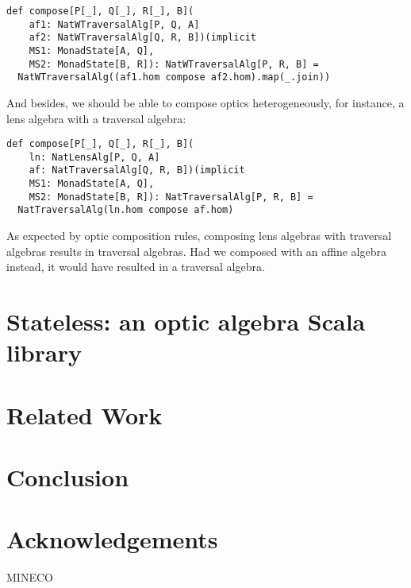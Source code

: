\documentclass[final, twocolumn, 3p]{elsarticle}
\begin{document}
\begin{lstlisting}
def compose[P[_], Q[_], R[_], B](
    af1: NatWTraversalAlg[P, Q, A]
    af2: NatWTraversalAlg[Q, R, B])(implicit
    MS1: MonadState[A, Q],
    MS2: MonadState[B, R]): NatWTraversalAlg[P, R, B] =
  NatWTraversalAlg((af1.hom compose af2.hom).map(_.join))
\end{lstlisting}

And besides, we should be able to compose optics heterogeneously, for instance,
a lens algebra with a traversal algebra:

\begin{lstlisting}
def compose[P[_], Q[_], R[_], B](
    ln: NatLensAlg[P, Q, A]
    af: NatTraversalAlg[Q, R, B])(implicit
    MS1: MonadState[A, Q],
    MS2: MonadState[B, R]): NatTraversalAlg[P, R, B] =
  NatTraversalAlg(ln.hom compose af.hom)
\end{lstlisting}

As expected by optic composition rules, composing lens algebras with traversal
algebras results in traversal algebras. Had we composed with an affine algebra
instead, it would have resulted in a traversal algebra.

\section{Stateless: an optic algebra Scala library}
\label{sec:Stateless}



\section{Related Work}
\label{sec:Discussion}

\section{Conclusion}



\section*{Acknowledgements}
MINECO

{}

\end{document}
